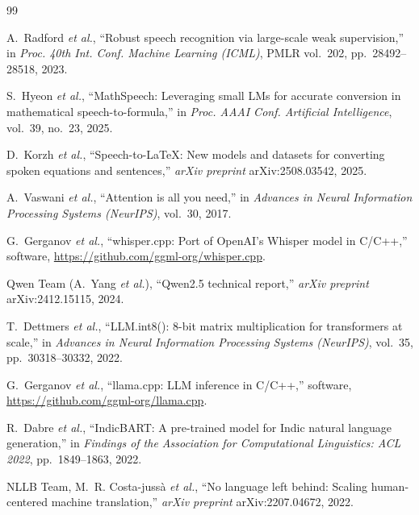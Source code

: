 \documentclass[11pt,a4paper,oneside]{report}
\theoremstyle{definition}
\begin{document}
\begingroup
\renewcommand{\bibname}{References}
\setlength{\parskip}{0pt}
\footnotesize{}
\begin{thebibliography}{99}
\setlength{\itemsep}{0.6pt}

A.~Radford \emph{et al.}, ``Robust speech recognition via large-scale weak supervision,'' in \emph{Proc. 40th Int. Conf. Machine Learning (ICML)}, PMLR vol.~202, pp.~28492--28518, 2023.

S.~Hyeon \emph{et al.}, ``MathSpeech: Leveraging small LMs for accurate conversion in mathematical speech-to-formula,'' in \emph{Proc. AAAI Conf. Artificial Intelligence}, vol.~39, no.~23, 2025.

D.~Korzh \emph{et al.}, ``Speech-to-LaTeX: New models and datasets for converting spoken equations and sentences,'' \emph{arXiv preprint} arXiv:2508.03542, 2025.

A.~Vaswani \emph{et al.}, ``Attention is all you need,'' in \emph{Advances in Neural Information Processing Systems (NeurIPS)}, vol.~30, 2017.

G.~Gerganov \emph{et al.}, ``whisper.cpp: Port of OpenAI's Whisper model in C/C++,'' software, \url{https://github.com/ggml-org/whisper.cpp}.

Qwen Team (A.~Yang \emph{et al.}), ``Qwen2.5 technical report,'' \emph{arXiv preprint} arXiv:2412.15115, 2024.

T.~Dettmers \emph{et al.}, ``LLM.int8(): 8-bit matrix multiplication for transformers at scale,'' in \emph{Advances in Neural Information Processing Systems (NeurIPS)}, vol.~35, pp.~30318--30332, 2022.

G.~Gerganov \emph{et al.}, ``llama.cpp: LLM inference in C/C++,'' software, \url{https://github.com/ggml-org/llama.cpp}.

R.~Dabre \emph{et al.}, ``IndicBART: A pre-trained model for Indic natural language generation,'' in \emph{Findings of the Association for Computational Linguistics: ACL 2022}, pp.~1849--1863, 2022.

NLLB Team, M.~R. Costa-juss{\`a} \emph{et al.}, ``No language left behind: Scaling human-centered machine translation,'' \emph{arXiv preprint} arXiv:2207.04672, 2022.


\end{thebibliography}
\end{document}
